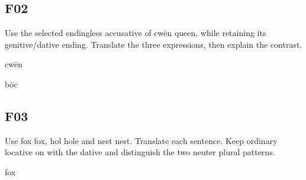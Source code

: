 



\subsection*{F02}

Use the selected endingless accusative of cwēn queen, while retaining its genitive/\allowbreak{}dative ending. Translate the three expressions, then explain the contrast.

cwēn

bōc





\subsection*{F03}

Use fox fox, hol hole and nest nest. Translate each sentence. Keep ordinary locative on with the dative and distinguish the two neuter plural patterns.

fox

